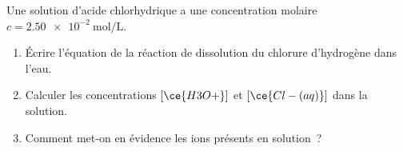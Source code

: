 Une solution d'acide chlorhydrique a une concentration molaire
$c=\qty{2.50e-2}{\mol\per\L}$.
\begin{enumerate}
    \item Écrire l'équation de la réaction de dissolution du chlorure
          d'hydrogène dans l'eau.
    \item Calculer les concentrations $\left[\ce{H3O+}\right]$ et
          $\left[\ce{Cl-(aq)}\right]$ dans la solution.
    \item Comment met-on en évidence les ions présents en solution~?
\end{enumerate}

